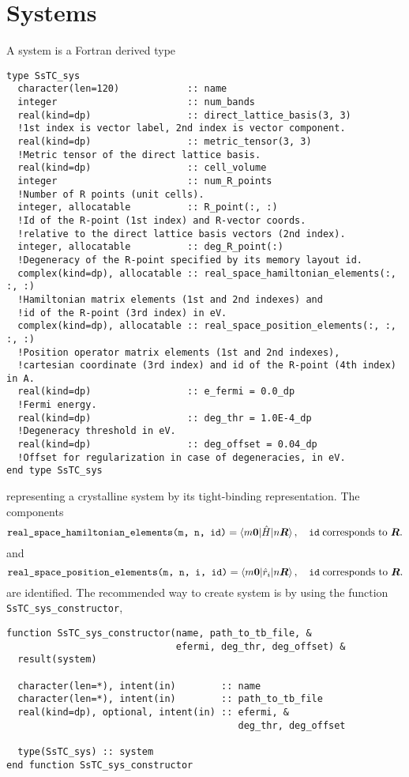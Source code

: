 \documentclass[10pt,a4paper]{article}
\begin{document}
\section{Systems}
A system is a Fortran derived type
\begin{lstlisting}[caption={Derived type corresponding to a system.},captionpos=b]
type SsTC_sys
  character(len=120)            :: name
  integer                       :: num_bands
  real(kind=dp)                 :: direct_lattice_basis(3, 3)
  !1st index is vector label, 2nd index is vector component.
  real(kind=dp)                 :: metric_tensor(3, 3)
  !Metric tensor of the direct lattice basis.
  real(kind=dp)                 :: cell_volume
  integer                       :: num_R_points
  !Number of R points (unit cells).
  integer, allocatable          :: R_point(:, :)
  !Id of the R-point (1st index) and R-vector coords. 
  !relative to the direct lattice basis vectors (2nd index).
  integer, allocatable          :: deg_R_point(:)
  !Degeneracy of the R-point specified by its memory layout id.
  complex(kind=dp), allocatable :: real_space_hamiltonian_elements(:, :, :)
  !Hamiltonian matrix elements (1st and 2nd indexes) and 
  !id of the R-point (3rd index) in eV.
  complex(kind=dp), allocatable :: real_space_position_elements(:, :, :, :) 
  !Position operator matrix elements (1st and 2nd indexes), 
  !cartesian coordinate (3rd index) and id of the R-point (4th index) in A.
  real(kind=dp)                 :: e_fermi = 0.0_dp
  !Fermi energy.
  real(kind=dp)                 :: deg_thr = 1.0E-4_dp
  !Degeneracy threshold in eV.
  real(kind=dp)                 :: deg_offset = 0.04_dp
  !Offset for regularization in case of degeneracies, in eV.
end type SsTC_sys
\end{lstlisting}
representing a crystalline system by its tight-binding \cite{marzariMaximallyLocalizedWannier2012} representation. The components
\begin{equation}
\verb|real_space_hamiltonian_elements(m, n, id)| = \braket{m\bm{0}|\hat{H}|n\bm{R}},\quad \verb|id|\;\text{corresponds to }\bm{R}.
\end{equation}
and
\begin{equation}
\verb|real_space_position_elements(m, n, i, id)| = \braket{m\bm{0}|\hat{r}_i|n\bm{R}},\quad \verb|id|\;\text{corresponds to }\bm{R}.
\end{equation}
are identified.
The recommended way to create system is by using the function \verb|SsTC_sys_constructor|,
\begin{lstlisting}[caption={Interface of the system constructor.},captionpos=b]
function SsTC_sys_constructor(name, path_to_tb_file, &
                              efermi, deg_thr, deg_offset) &
  result(system)

  character(len=*), intent(in)        :: name
  character(len=*), intent(in)        :: path_to_tb_file
  real(kind=dp), optional, intent(in) :: efermi, &
                                         deg_thr, deg_offset

  type(SsTC_sys) :: system
end function SsTC_sys_constructor
\end{lstlisting}
\end{document}
